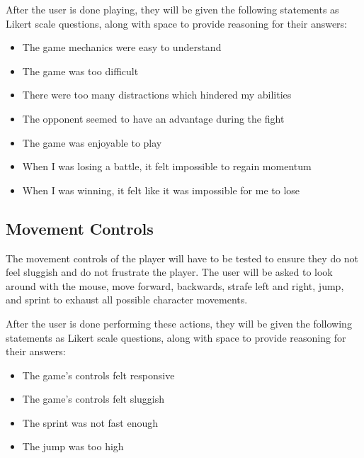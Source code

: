 After the user is done playing, they will be given the following statements as Likert scale questions, along with space to provide reasoning for their answers:

\begin{itemize}
\item{The game mechanics were easy to understand}
\item{The game was too difficult}
\item{There were too many distractions which hindered my abilities}
\item{The opponent seemed to have an advantage during the fight}
\item{The game was enjoyable to play}
\item{When I was losing a battle, it felt impossible to regain momentum}
\item{When I was winning, it felt like it was impossible for me to lose}
\end{itemize}

\subsection{Movement Controls}
The movement controls of the player will have to be tested to ensure they do not feel sluggish and do not frustrate the player. The user will be asked to look around with the mouse, move forward, backwards, strafe left and right, jump, and sprint to exhaust all possible character movements.

After the user is done performing these actions, they will be given the following statements as Likert scale questions, along with space to provide reasoning for their answers:

\begin{itemize}
\item{The game's controls felt responsive}
\item{The game's controls felt sluggish}
\item{The sprint was not fast enough}
\item{The jump was too high}
\end{itemize}